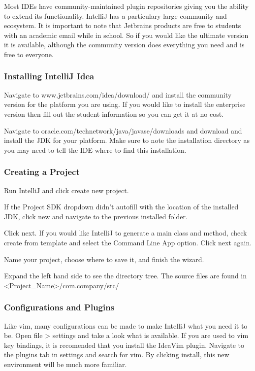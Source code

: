 \documentclass[../../main.tex]{subfiles}
\begin{document}
Most IDEs have community-maintained plugin repositories giving you the ability to extend its functionality.
IntelliJ has a particulary large community and ecosystem. It is important to note that Jetbrains products
are free to students with an academic email while in school. So if you would like the ultimate version it 
is available, although the community version does everything you need and is free to everyone.

\pagebreak

\subsubsection{Installing IntelliJ Idea}
\begin{steps}
   \item Navigate to www.jetbrains.com/idea/download/ and install the community version for the platform you are using. If you would like to
      install the enterprise version then fill out the student information so you can get it at no cost.
   \item Navigate to oracle.com/technetwork/java/javase/downloads and download and install the JDK for your platform. Make sure to note the
      installation directory as you may need to tell the IDE where to find this installation.
\end{steps}

\subsubsection{Creating a Project}
\begin{steps}
   \item Run IntelliJ and click create new project.
   \item If the Project SDK dropdown didn't autofill with the location of the installed JDK, click new and navigate to the previous installed
      folder.
   \item Click next. If you would like IntelliJ to generate a main class and method, check create from template and select the Command Line App
      option. Click next again.
   \item Name your project, choose where to save it, and finish the wizard.
   \item Expand the left hand side to see the directory tree. The source files are found in <Project_Name>/com.company/src/
\end{steps}

\subsubsection{Configurations and Plugins}
Like vim, many configurations can be made to make IntelliJ what you need it to be. Open file > settings and take a look what is available.
If you are used to vim key bindings, it is recomended that you install the IdeaVim plugin. Navigate to the plugins tab in settings and search
for vim. By clicking install, this new environment will be much more familiar.
\end{document}
